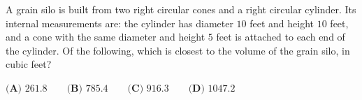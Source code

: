 A grain silo is built from two right circular cones and a right circular cylinder. Its internal measurements are: the cylinder has diameter $10$ feet and height $10$ feet, and a cone with the same diameter and height $5$ feet is attached to each end of the cylinder. Of the following, which is closest to the volume of the grain silo, in cubic feet?

$\textbf{(A) } 261.8\qquad\textbf{(B) } 785.4\qquad\textbf{(C) } 916.3\qquad\textbf{(D) } 1047.2$
